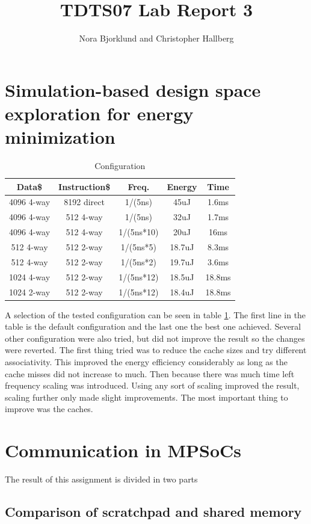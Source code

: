 \documentclass[a4paper, 12pt]{article}
\title{TDTS07 Lab Report 3}
\author{Nora Bjorklund and Christopher Hallberg}
\begin{document}
\maketitle


\section{Simulation-based design space exploration for energy minimization}

\begin{table}[h]
  \centering
  \begin{tabular}{c c c c c}
    \hline
    Data\$ & Instruction\$ & Freq. & Energy & Time \\
    \hline
    4096 4-way & 8192 direct & 1/(5ns) & 45uJ & 1.6ms \\
    4096 4-way & 512 4-way & 1/(5ns) & 32uJ & 1.7ms \\
    4096 4-way & 512 4-way & 1/(5ns*10) & 20uJ & 16ms \\
    512 4-way & 512 2-way & 1/(5ns*5) & 18.7uJ & 8.3ms \\
    512 4-way & 512 2-way & 1/(5ns*2) & 19.7uJ & 3.6ms \\
    1024 4-way & 512 2-way & 1/(5ns*12) & 18.5uJ & 18.8ms \\
    \hline
    1024 2-way & 512 2-way & 1/(5ns*12) & 18.4uJ & 18.8ms \\
    \hline
  \end{tabular}
  \caption{Configuration}
  \label{fig:conf}
\end{table}
A selection of the tested configuration can be seen in table \ref{fig:conf}.
The first line in the table is the default configuration and the last one the
best one achieved. Several other configuration were also tried, but did not
improve the result so the changes were reverted. The first thing tried was to
reduce the cache sizes and try different associativity. This improved the energy
efficiency considerably as long as the cache misses did not increase to much.
Then because there was much time left frequency scaling was introduced. Using
any sort of scaling improved the result, scaling further only made slight
improvements. The most important thing to improve was the caches. 

\section{Communication in MPSoCs}
The result of this assignment is divided in two parts
\subsection{Comparison of scratchpad and shared memory}
\end{document}
